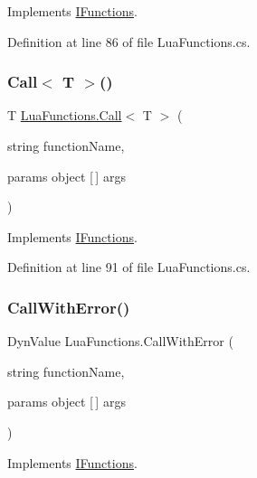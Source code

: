 Implements \hyperlink{interface_i_functions_a0d5502d86d4b34c04f36d7f8a41c5f27}{I\+Functions}.



Definition at line 86 of file Lua\+Functions.\+cs.

\mbox{\label{class_lua_functions_ac1bbf0ec272f91f4322e89796deadf52}} 
\subsubsection{\texorpdfstring{Call$<$ T $>$()}{Call< T >()}}
{\footnotesize\ttfamily T \hyperlink{class_lua_functions_a8662db102890d5b12fada540482c51eb}{Lua\+Functions.\+Call}$<$ T $>$ (\begin{DoxyParamCaption}\item[{string}]{function\+Name,  }\item[{params object \mbox{[}$\,$\mbox{]}}]{args }\end{DoxyParamCaption})}



Implements \hyperlink{interface_i_functions_ab14a9a3261c860d7dba22a9c927f1068}{I\+Functions}.



Definition at line 91 of file Lua\+Functions.\+cs.

\mbox{\label{class_lua_functions_a8fcb93802ded2a89af4ce20efef82a70}} 
\subsubsection{\texorpdfstring{Call\+With\+Error()}{CallWithError()}}
{\footnotesize\ttfamily Dyn\+Value Lua\+Functions.\+Call\+With\+Error (\begin{DoxyParamCaption}\item[{string}]{function\+Name,  }\item[{params object \mbox{[}$\,$\mbox{]}}]{args }\end{DoxyParamCaption})}



Implements \hyperlink{interface_i_functions_a6914f7ab45913120802554ac2ef28dba}{I\+Functions}.



